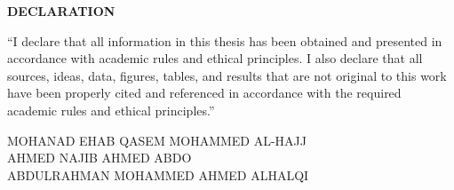 \clearpage
\thispagestyle{plain}
{}

\begin{center}
{\bfseries\Large DECLARATION}
\end{center}

\vspace{1.5cm}

\noindent
``I declare that all information in this thesis has been obtained and presented
in accordance with academic rules and ethical principles. I also declare that
all sources, ideas, data, figures, tables, and results that are not original to
this work have been properly cited and referenced in accordance with the
required academic rules and ethical principles.''

\vfill

\begin{flushright}
MOHANAD EHAB QASEM MOHAMMED AL-HAJJ\\
AHMED NAJIB AHMED ABDO\\
ABDULRAHMAN MOHAMMED AHMED ALHALQI
\end{flushright}

\clearpage
